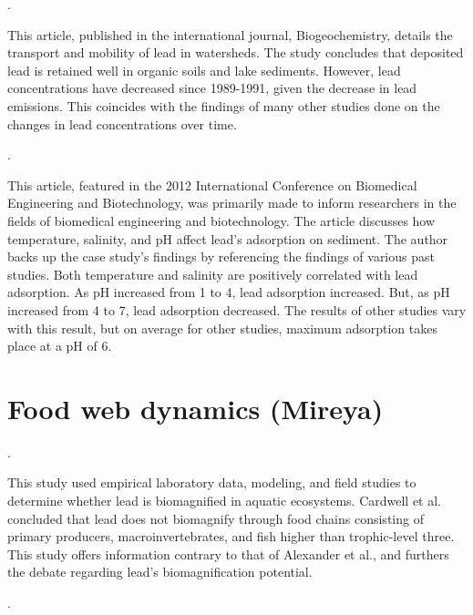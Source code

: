 \documentclass{article}
\begin{document}
\medskip

\noindent {}.

\medskip

This article, published in the international journal, Biogeochemistry, details the transport and mobility of lead in watersheds. The study concludes that deposited lead is retained well in organic soils and lake sediments. However, lead concentrations have decreased since 1989-1991, given the decrease in lead emissions. This coincides with the findings of many other studies done on the changes in lead concentrations over time. 

\medskip

\noindent {}.

\medskip

This article, featured in the 2012 International Conference on Biomedical Engineering and Biotechnology, was primarily made to inform researchers in the fields of biomedical engineering and biotechnology. The article discusses how temperature, salinity, and pH affect lead’s adsorption on sediment. The author backs up the case study’s findings by referencing the findings of various past studies. Both temperature and salinity are positively correlated with lead adsorption. As pH increased from 1 to 4, lead adsorption increased. But, as pH increased from 4 to 7, lead adsorption decreased. The results of other studies vary with this result, but on average for other studies, maximum adsorption takes place at a pH of 6. 

\medskip

\section{Food web dynamics (Mireya)}

.

\bigskip

This study used empirical laboratory data, modeling, and field studies to determine whether lead is biomagnified in aquatic ecosystems. Cardwell et al. concluded that lead does not biomagnify through food chains consisting of primary producers, macroinvertebrates, and fish higher than trophic-level three. This study offers information contrary to that of Alexander et al., and furthers the debate regarding lead’s biomagnification potential. 

.

\bigskip
\end{document}
